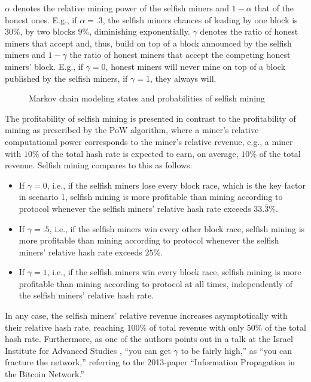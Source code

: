$\alpha$ denotes the relative mining power of the selfish miners and $1 - \alpha$ that of the honest ones.
E.g., if $\alpha = .3$, the selfish miners chances of  leading by one block is $30\%$, by two blocks $9\%$, diminishing exponentially.
$\gamma$ denotes the ratio of honest miners that accept and, thus, build on top of a block announced by the selfish miners and $1 - \gamma$ the ratio of honest miners that accept the competing honest miners' block.
E.g., if $\gamma = 0$, honest miners will never mine on top of a block published by the selfish miners, if $\gamma = 1$, they always will.
\\
\begin{figure}[H]
\centering

\caption*{
  Markov chain modeling states and probabilities of selfish mining \autocite[8]{eyal2014}
}
\end{figure}

The profitability of selfish mining is presented in contrast to the profitability of mining as prescribed by the PoW algorithm, where a miner's relative computational power corresponds to the miner's relative revenue, e.g., a miner with $10\%$ of the total hash rate is expected to earn, on average, $10\%$ of the total revenue.
Selfish mining compares to this as follows:

\begin{itemize}
\item
If $\gamma = 0$, i.e., if the selfish miners lose every block race, which is the key factor in scenario 1, selfish mining is more profitable than mining according to protocol whenever the selfish miners' relative hash rate exceeds $33.\overline{3}\%$.
\item
If $\gamma = .5$, i.e., if the selfish miners win every other block race, selfish mining is more profitable than mining according to protocol whenever the selfish miners' relative hash rate exceeds $25\%$.
\item
If $\gamma = 1$, i.e., if the selfish miners win every block race, selfish mining is more profitable than mining according to protocol at all times, independently of the selfish miners' relative hash rate.
\end{itemize}

In any case, the selfish miners' relative revenue increases asymptotically with their relative hash rate, reaching $100\%$ of total revenue with only $50\%$ of the total hash rate.
Furthermore, as one of the authors points out in a talk at the Israel Institute for Advanced Studies \autocite{youtube2018alttonakamotoconsensus}, ``you can get $\gamma$ to be fairly high,'' as ``you can fracture the network,'' referring to the 2013-paper ``Information Propagation in the Bitcoin Network.'' \autocite{decker2013}

